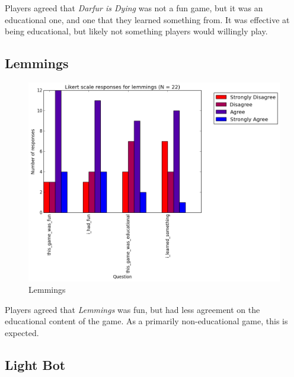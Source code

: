 				Players agreed that \textit{Darfur is Dying} was not a fun game, but it was an educational one, and one that they learned something from. It was effective at being educational, but likely not something players would willingly play.

			\subsection{Lemmings}

				\begin{figure}[] 
				\centering 
				\includegraphics[width=\textwidth, height=.4\textheight, keepaspectratio=true]{lemmings_likert.png} 
				\caption{Lemmings}
				\end{figure}

				Players agreed that \textit{Lemmings} was fun, but had less agreement on the educational content of the game. As a primarily non-educational game, this is expected.

			\subsection{Light Bot}


